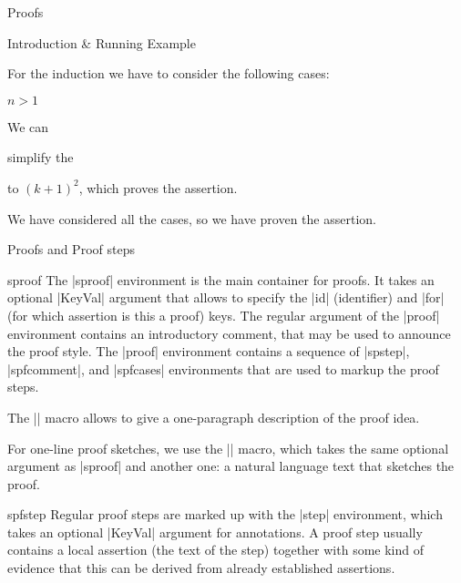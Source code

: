 \begin{sfragment}{Proofs}
\begin{sfragment}{Introduction \& Running Example}
\begin{mdframed}
\begin{sproof}[id=simple-proof]
\begin{spfcases}{For the induction we have to consider the following cases:}
\begin{spfcase}{$n>1$}
\begin{spfstep}[type=conclusion]
       We can \begin{justification}[method=simplify-eq]
         simplify the {}
       \end{justification} to $(k+1)^2$, which proves the assertion.
     \end{spfstep}
   \end{spfcase}
   \begin{spfstep}[type=conclusion]
     We have considered all the cases, so we have proven the assertion.
   \end{spfstep}
  \end{spfcases}
\end{sproof}
\end{mdframed}

\end{sfragment}

\begin{sfragment}{Proofs and Proof steps}

  \begin{environment}{sproof}
    The |sproof| environment is the main container for proofs. It takes an optional
    |KeyVal| argument that allows to specify the |id| (identifier) and |for| (for which
    assertion is this a proof) keys. The regular argument of the |proof| environment
    contains an introductory comment, that may be used to announce the proof style. The
    |proof| environment contains a sequence of |spstep|, |spfcomment|, and |spfcases|
    environments that are used to markup the proof steps.
  \end{environment}
  
  \begin{function}{\spfidea}
    The |\spfidea| macro allows to give a one-paragraph description of the proof idea.
  \end{function}
  
  \begin{function}{\spfsketch}
    For one-line proof sketches, we use the |\spfsketch| macro, which takes the same
    optional argument as |sproof| and another one: a natural language text that sketches
    the proof.
  \end{function}
  
  \begin{environment}{spfstep}
    Regular proof steps are marked up with the |step| environment, which takes an optional
    |KeyVal| argument for annotations. A proof step usually contains a local assertion
    (the text of the step) together with some kind of evidence that this can be derived
    from already established assertions.
  \end{environment}
  

\end{sfragment}
\end{sfragment}
